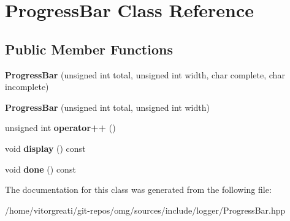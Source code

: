 \hypertarget{class_progress_bar}{}\section{Progress\+Bar Class Reference}
\label{class_progress_bar}
\subsection*{Public Member Functions}
\begin{DoxyCompactItemize}
\item 
\mbox{\label{class_progress_bar_a5bf8312df61b462416ae1e034513621f}} 
{\bfseries Progress\+Bar} (unsigned int total, unsigned int width, char complete, char incomplete)
\item 
\mbox{\label{class_progress_bar_ac986efc4cc49be7277d880dc2426849c}} 
{\bfseries Progress\+Bar} (unsigned int total, unsigned int width)
\item 
\mbox{\label{class_progress_bar_ad0ad956a659502b816c0e4332ec1e0dc}} 
unsigned int {\bfseries operator++} ()
\item 
\mbox{\label{class_progress_bar_a909892ad623435dc7d446abea0b1435c}} 
void {\bfseries display} () const
\item 
\mbox{\label{class_progress_bar_a9f2e824efdf35ad18a991e6000a4cabf}} 
void {\bfseries done} () const
\end{DoxyCompactItemize}


The documentation for this class was generated from the following file\+:\begin{DoxyCompactItemize}
\item 
/home/vitorgreati/git-\/repos/omg/sources/include/logger/Progress\+Bar.\+hpp\end{DoxyCompactItemize}
